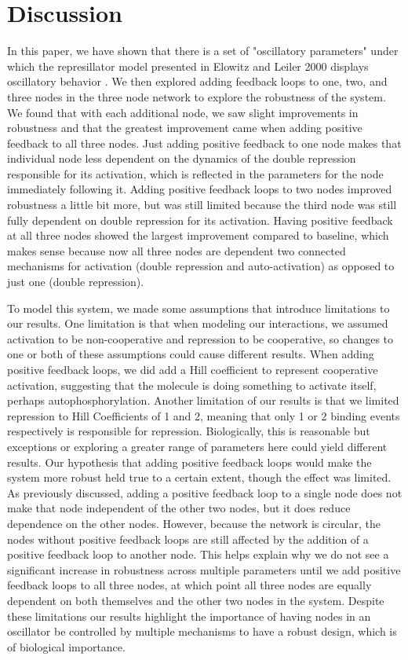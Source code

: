 \documentclass{article}
\begin{document}
\section{Discussion}

In this paper, we have shown that there is a set of "oscillatory parameters" under which the represillator model presented in Elowitz and Leiler 2000 displays oscillatory behavior \cite{represillator}. We then explored adding feedback loops to one, two, and three nodes in the three node network to explore the robustness of the system. We found that with each additional node, we saw slight improvements in robustness and that the greatest improvement came when adding positive feedback to all three nodes. Just adding positive feedback to one node makes that individual node less dependent on the dynamics of the double repression responsible for its activation, which is reflected in the parameters for the node immediately following it. Adding positive feedback loops to two nodes improved robustness a little bit more, but was still limited because the third node was still fully dependent on double repression for its activation. Having positive feedback at all three nodes showed the largest improvement compared to baseline, which makes sense because now all three nodes are dependent two connected mechanisms for activation (double repression and auto-activation) as opposed to just one (double repression).  

To model this system, we made some assumptions that introduce limitations to our results. One limitation is that when modeling our interactions, we assumed activation to be non-cooperative and repression to be cooperative, so changes to one or both of these assumptions could cause different results. When adding positive feedback loops, we did add a Hill coefficient to represent cooperative activation, suggesting that the molecule is doing something to activate itself, perhaps autophosphorylation. Another limitation of our results is that we limited repression to Hill Coefficients of 1 and 2, meaning that only 1 or 2 binding events respectively is responsible for repression. Biologically, this is reasonable but exceptions or exploring a greater range of parameters here could yield different results. Our hypothesis that adding positive feedback loops would make the system more robust held true to a certain extent, though the effect was limited. As previously discussed, adding a positive feedback loop to a single node does not make that node independent of the other two nodes, but it does reduce dependence on the other nodes. However, because the network is circular, the nodes without positive feedback loops are still affected by the addition of a positive feedback loop to another node. This helps explain why we do not see a significant increase in robustness across multiple parameters until we add positive feedback loops to all three nodes, at which point all three nodes are equally dependent on both themselves and the other two nodes in the system. Despite these limitations our results highlight the importance of having nodes in an oscillator be controlled by multiple mechanisms to have a robust design, which is of biological importance.
\end{document}
